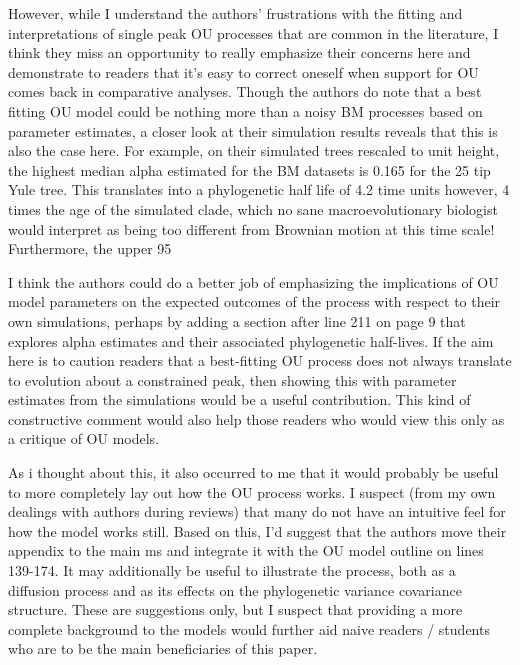 \documentclass[11pt]{letter}
\begin{document}
\begin{letter}{}
However, while I understand the authors’ frustrations with the fitting and interpretations of single peak OU processes that are common in the literature, I think they miss an opportunity to really emphasize their concerns here and demonstrate to readers that it’s easy to correct oneself when support for OU comes back in comparative analyses. Though the authors do note that a best fitting OU model could be nothing more than a noisy BM processes based on parameter estimates, a closer look at their simulation results reveals that this is also the case here. For example, on their simulated trees rescaled to unit height, the highest median alpha estimated for the BM datasets is 0.165 for the 25 tip Yule tree. This translates into a phylogenetic half life of 4.2 time units however, 4 times the age of the simulated clade, which no sane macroevolutionary biologist would interpret as being too different from Brownian motion at this time scale! Furthermore, the upper 95%

I think the authors could do a better job of emphasizing the implications of OU model parameters on the expected outcomes of the process with respect to their own simulations, perhaps by adding a section after line 211 on page 9 that explores alpha estimates and their associated phylogenetic half-lives. If the aim here is to caution readers that a best-fitting OU process does not always translate to evolution about a  constrained peak, then showing this with parameter estimates from the simulations would be a useful contribution. This kind of constructive comment would also help those readers who would view this only as a critique of OU models.

As i thought about this, it also occurred to me that it would probably be useful to more completely lay out how the OU process works. I suspect (from my own dealings with authors during reviews) that many do not have an intuitive feel for how the model works still. Based on this, I’d suggest that the authors move their appendix to the main ms and integrate it with the OU model outline on lines 139-174. It may additionally be useful to illustrate the process, both as a diffusion process and as its effects on the phylogenetic variance covariance structure. These are suggestions only, but I suspect that providing a more complete background to the models would further aid naive readers / students who are to be the main beneficiaries of this paper.



\end{letter}
\end{document}
